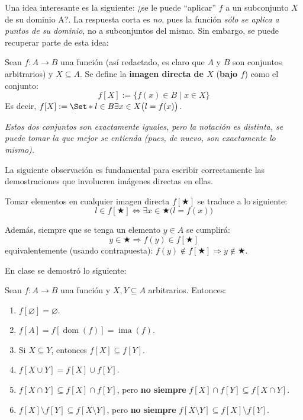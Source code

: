 \documentclass[letterpaper,DIV=14,headsepline,12pt]{scrartcl}
\providecommand\tq{\;|\;}
\providecommand\given{}
\renewcommand{\emptyset}{\varnothing}
\DeclareMathOperator{\ima}{ima}
\DeclareMathOperator{\dom}{dom}
\begin{document}
    Una idea interesante es la siguiente: ¿se le puede ``aplicar'' $f$ a un subconjunto $X$ de su dominio A?. La respuesta corta es \textit{no}, pues la función \textit{sólo se aplica a puntos de su dominio}, no a subconjuntos del mismo. Sin embargo, se puede recuperar parte de esta idea:

    \begin{definicion}
        Sean $f:A \to B$ una función (así redactado, es claro que $A$ y $B$ son conjuntos arbitrarios) y $X \subseteq A$. Se define la \textbf{imagen directa de $X$} (\textbf{bajo $f$}) como el conjunto:
        \[ f[X]:=\{ f(x) \in B \tq x \in X \} \]
        Es decir, $ f[X]:=\Set*{ l \in B \given \exists x \in X \big( l=f(x) \big)} $.

        \textit{Estos dos conjuntos son exactamente iguales, pero la notación es distinta, se puede tomar la que mejor se entienda (pues, de nuevo, son exactamente lo mismo).}
    \end{definicion}

    La siguiente observación es fundamental para escribir correctamente las demostraciones que involucren imágenes directas en ellas.

    \begin{observacion}
        Tomar elementos en cualquier imagen directa $f[\bigstar]$ se traduce a lo siguiente:
        \begin{equation}\label{directa}
            l \in f[\bigstar] \iff \exists x \in \bigstar \big( l=f(x) \big)
        \end{equation}

        Además, siempre que se tenga un elemento $y \in A$ se cumplirá:
        \[ y \in \bigstar \Rightarrow f(y) \in f[\bigstar] \]
        equivalentemente (usando contrapuesta): $f(y) \notin f[\bigstar] \Rightarrow y \notin \bigstar$.
    \end{observacion}

    En clase se demostró lo siguiente:
    \begin{teorema}
        Sean $f:A \to B$ una función y $X, Y \subseteq A$ arbitrarios. Entonces:
        \begin{enumerate}
            \item $f[\emptyset]=\emptyset$.
            \item $f[A]=f[\dom(f)]=\ima(f)$.
            \item Si $X \subseteq Y$, entonces $f[X] \subseteq f[Y]$.
            \item $f[X \cup Y] = f[X] \cup f[Y]$.
            \item $f[X \cap Y] \subseteq f[X] \cap f[Y]$, pero \textbf{no siempre} $f[X] \cap f[Y] \subseteq f[X \cap Y]$.
            \item $f[X] \setminus f[Y] \subseteq f[X \setminus Y]$, pero \textbf{no siempre} $f[X \setminus Y] \subseteq f[X] \setminus f[Y]$.
        \end{enumerate}
    \end{teorema}
\end{document}
